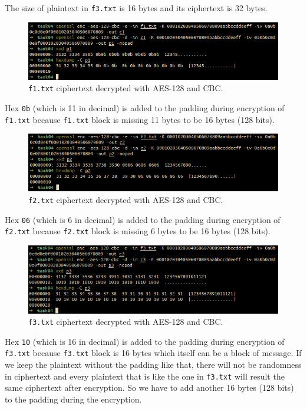 \documentclass{article}
\begin{document}
\begin{enumerate}
        The size of plaintext in \texttt{f3.txt} is 16 bytes and its ciphertext
        is 32 bytes.

        \begin{figure}[!ht]
            \centering
            \includegraphics[scale=0.68]{task04_2_d1.png}
            \caption{\texttt{f1.txt} ciphertext decrypted with AES-128 and CBC.}
        \end{figure}

        Hex \texttt{0b} (which is 11 in decimal) is added to the padding during
        encryption of \texttt{f1.txt} because \texttt{f1.txt} block is missing
        11 bytes to be 16 bytes (128 bits).

        \begin{figure}[!ht]
            \centering
            \includegraphics[scale=0.68]{task04_2_d2.png}
            \caption{\texttt{f2.txt} ciphertext decrypted with AES-128 and CBC.}
        \end{figure}

        Hex \texttt{06} (which is 6 in decimal) is added to the padding during
        encryption of \texttt{f2.txt} because \texttt{f2.txt} block is missing
        6 bytes to be 16 bytes (128 bits).

        \begin{figure}[!ht]
            \centering
            \includegraphics[scale=0.68]{task04_2_d3.png}
            \caption{\texttt{f3.txt} ciphertext decrypted with AES-128 and CBC.}
        \end{figure}

        Hex \texttt{10} (which is 16 in decimal) is added to the padding during
        encryption of \texttt{f3.txt} because \texttt{f3.txt} block is 16 bytes
        which itself can be a block of message. If we keep the plaintext
        without the padding like that, there will not be randomness in ciphertext
        and every plaintext that is like the one in \texttt{f3.txt} will result
        the same ciphertext after encryption. So we have to add another 16 bytes
        (128 bits) to the padding during the encryption.
\end{enumerate}
\end{document}
